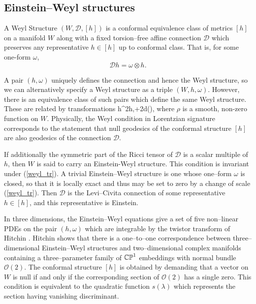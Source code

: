 \subsection{Einstein--Weyl structures}
\begin{defi}
A Weyl Structure $(W,\mathscr{D},[h])$ is a conformal equivalence class of metrics $[h]$ on a manifold $W$ along with a fixed torsion--free affine connection $\mathscr{D}$ which preserves any representative $h\in[h]$ up to conformal class. That is, for some one-form $\omega$,
\[
\mathscr{D}h=\omega\otimes h.
\]
\end{defi}
A pair $(h,\omega)$ uniquely defines the connection and hence the Weyl structure, so we can alternatively specify a Weyl structure as a triple $(W,h,\omega)$. However, there is an equivalence class of such pairs which define the same Weyl structure. These are related by transformations
\be
\label{weyl_tr}
h\rightarrow \rho^2h,\quad\omega\rightarrow\omega+2d(\rho),
\ee
where $\rho$ is a smooth, non-zero function on $W$. 
Physically, the Weyl condition in Lorentzian signature corresponds to the statement that null geodesics of the conformal structure $[h]$ are also geodesics of the connection $\mathscr{D}$.

If additionally the symmetric part of the Ricci tensor of $\mathscr{D}$ is a scalar multiple of $h$, then $W$ is said to carry an Einstein-Weyl structure.
This condition is invariant under (\ref{weyl_tr}). A trivial Einstein--Weyl structure is one whose one--form $\omega$ is closed, so that it is locally exact and thus may be set to zero by a change of scale (\ref{weyl_tr}). Then $\mathscr{D}$ is the Levi--Civita connection of some representative $h\in[h]$, and this representative is Einstein.

In three dimensions, the Einstein--Weyl equations give a set of five non--linear PDEs on the pair $(h, \omega)$ which are integrable by the twistor transform of Hitchin \cite{hitchin}. Hitchin shows that there is a one--to--one correspondence between three--dimensional Einstein--Weyl structures and two--dimensional complex manifolds containing a three--parameter family of $\mathbb{CP}^1$ embeddings with normal bundle $\mathcal{O}(2)$. The conformal structure $[h]$ is obtained by demanding that a vector on $W$ is null if and only if the corresponding section of $\mathcal{O}(2)$ has a single zero. This condition is equivalent to the quadratic function $s(\lambda)$ which represents the section having vanishing discriminant.

